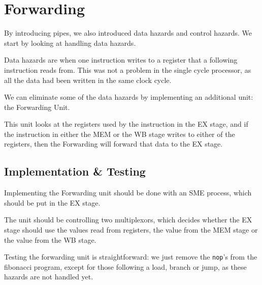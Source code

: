 \documentclass{beamer}
\begin{document}
\section{Forwarding}
\begin{frame}
    By introducing pipes, we also introduced data hazards and control hazards.
    We start by looking at handling data hazards.

    \vspace{\baselineskip}
    Data hazards are when one instruction writes to a register that a following
    instruction reads from. This was not a problem in the single cycle
    processor, as all the data had been written in the same clock cycle.
\end{frame}
\begin{frame}
    We can eliminate some of the data hazards by implementing an additional
    unit: the Forwarding Unit.

    \vspace{\baselineskip}
    This unit looks at the registers used by the instruction in the EX stage,
    and if the instruction in either the MEM or the WB stage writes to either
    of the registers, then the Forwarding will forward that data to the EX
    stage.
\end{frame}

\subsection{Implementation \& Testing}
\begin{frame}
    Implementing the Forwarding unit should be done with an SME process, which
    should be put in the EX stage.

    \vspace{\baselineskip}
    The unit should be controlling two multiplexors, which decides whether the
    EX stage should use the values read from registers, the value from the MEM
    stage or the value from the WB stage.

    \vspace{\baselineskip}
    Testing the forwarding unit is straightforward: we just remove the
    \texttt{nop}'s from the fibonacci program, except for those following a
    load, branch or jump, as these hazards are not handled yet.
\end{frame}

\AtBeginSection{}
\section*{}

%  
%  
\end{document}
